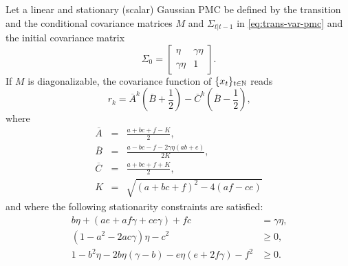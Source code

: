 \begin{proposition}
    \label{prop:cov}
    Let a linear and stationary (scalar) Gaussian PMC be defined by the transition and the conditional
    covariance matrices $M$ and $\Sigma_{t|t-1}$ in \eqref{eq:trans-var-pmc}
    and the initial covariance matrix 
    \begin{equation*}
    \Sigma_0 = \begin{bmatrix} \eta & \gamma \eta \\ \gamma \eta & 1 \end{bmatrix} \text{.} 
    \end{equation*}
    If $M$ is diagonalizable, the covariance function of $\{x_t\}_{t \in \mathbb{N}}$ reads 
    \begin{equation}
    \label{eq:cov-pmc}
    r_k= \overline{A}^{k} (\overline{B}+\frac{1}{2}) - \overline{C}^{k} (\overline{B}-\frac{1}{2})  \text{,}
    \end{equation}
    where 
    \begin{eqnarray*}
    \overline{A}&=& \frac{a + bc + f -K}{2}  \text{,} \\
    \overline{B} &=& \frac{a-bc-f-2 \gamma \eta (ab+e)}{2K}\text{,} \\
    \overline{C} &=&\frac{a + bc + f +K}{2} \text{,} \\
    K&=& \sqrt{(a+bc+f)^2 - 4(af  - ce )}
    \end{eqnarray*}
    and where the following stationarity constraints are satisfied:
    \begin{align*}
     b\eta+(ae+af\gamma+ce\gamma)+fc &=\gamma\eta \text{,}\\
     (1-a^2-2ac\gamma)\eta-c^2 & \geq 0 \text{,} \\
     1- b^2\eta- 2b\eta(\gamma-b)-e\eta(e+2f\gamma)-f^2 & \geq 0 \text{.}
    \end{align*}\\
\end{proposition}

